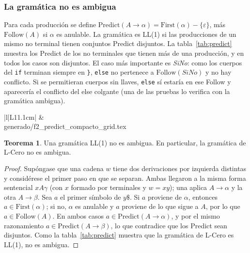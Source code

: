 \documentclass[11pt,a4paper]{article}
\makeatletter
\newenvironment{grilla}{\footnotesize\renewcommand{\arraystretch}{1.45}\setlength{\tabcolsep}{5pt}}{}
\theoremstyle{definition}
\newtheorem{teorema}{Teorema}
\newcommand{\nt}[1]{\textit{#1}}
\newcommand{\tm}[1]{\texttt{#1}}
\newcommand{\eps}{\varepsilon}
\newcommand{\First}{\mathrm{First}}
\newcommand{\Follow}{\mathrm{Follow}}
\newcommand{\Predict}{\mathrm{Predict}}
\renewcommand{\paragraph}[1]{\subsubsection*{#1}}
\newcommand{\tabla}[1]{\@@input #1 }
\makeatother
\begin{document}
\paragraph{La gramática no es ambigua}

Para cada producción se define
$\Predict(A \to \alpha) = \First(\alpha) - \{\eps\}$, más $\Follow(A)$ si
$\alpha$ es anulable. La gramática es LL(1) si las producciones de un mismo
no terminal tienen conjuntos Predict disjuntos. La tabla~\ref{tab:predict}
muestra los Predict de los \NConAlternativas{} no terminales que tienen más
de una producción, y en todos los casos son disjuntos. El caso más
importante es \nt{SiNo}: como los cuerpos del \tm{if} terminan siempre en
\tm{\}}, \tm{else} no pertenece a $\Follow(\nt{SiNo})$ y no hay conflicto.
Si se permitieran cuerpos sin llaves, \tm{else} sí estaría en ese Follow y
aparecería el conflicto del else colgante (una de las pruebas lo verifica
con la gramática ambigua).

\begin{table}[H]
\centering
\begin{grilla}
\begin{tabular}{|l|L{11.1cm}|}
\hline
{} &  \\ \hline
\tabla{generado/f2_predict_compacto_grid.tex}
\end{tabular}
\end{grilla}
\caption{Conjuntos Predict de los no terminales con más de una producción.}
\label{tab:predict}
\end{table}

\begin{teorema}
Una gramática LL(1) no es ambigua. En particular, la gramática de L-Cero no
es ambigua.
\end{teorema}

\begin{proof}
Supóngase que una cadena $w$ tiene dos derivaciones por izquierda distintas
y considérese el primer paso en que se separan. Ambas llegaron a la misma
forma sentencial $xA\gamma$ (con $x$ formado por terminales y $w = xy$); una
aplica $A \to \alpha$ y la otra $A \to \beta$. Sea $a$ el primer símbolo de
$y\tm{\$}$. Si $a$ proviene de $\alpha$, entonces $a \in \First(\alpha)$; si
no, $\alpha$ es anulable y $a$ proviene de lo que sigue a $A$, por lo que
$a \in \Follow(A)$. En ambos casos $a \in \Predict(A \to \alpha)$, y por el
mismo razonamiento $a \in \Predict(A \to \beta)$, lo que contradice que los
Predict sean disjuntos. Como la tabla~\ref{tab:predict} muestra que la
gramática de L-Cero es LL(1), no es ambigua.
\end{proof}
\end{document}
